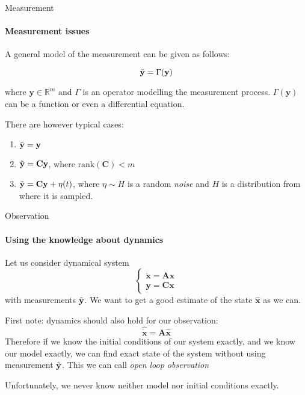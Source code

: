 \documentclass{beamer}
\begin{document}
\begin{frame}{Measurement}
\framesubtitle{Measurement issues}
\begin{flushleft}

A general model of the measurement can be given as follows:

\[
\Tilde{\mathbf y} = \Gamma(\mathbf y)
\]

where $\mathbf y \in \mathbb{R}^m$ and $\Gamma$ is an operator modelling the measurement process. $\Gamma(\mathbf y)$ can be a function or even a differential equation.

There are however typical cases:

\begin{enumerate}
\item $\Tilde{\mathbf y} = \mathbf y$
\item $\Tilde{\mathbf y} = \mathbf C \mathbf y$, where $\text{rank} (\mathbf C) < m$
\item $\Tilde{\mathbf y} = \mathbf C \mathbf y + \eta(t)$, where $\eta \sim H$ is a random \emph{noise} and $H$ is a distribution from where it is sampled.
\end{enumerate}

\end{flushleft}
\end{frame}

\begin{frame}{Observation}
\framesubtitle{Using the knowledge about dynamics}
\begin{flushleft}

Let us consider dynamical system
\[
\begin{cases}
\dot {\mathbf x} = \mathbf A \mathbf x\\
\mathbf y = \mathbf C \mathbf x
\end{cases}
\]
%
with measurements $\Tilde{\mathbf y}$. We want to get a good estimate of the state $\hat{\mathbf x}$ as we can.

\bigskip

First note: dynamics should also hold for our observation:
\[
\hat{\dot {\mathbf x}} = \mathbf A \hat{\mathbf x} 
\]
%
Therefore if we know the initial conditions of our system exactly, and we know our model exactly, we can find exact state of the system without using measurement $\Tilde{\mathbf y}$. This we can call \emph{open loop observation}

Unfortunately, we never know neither model nor initial conditions exactly.


\end{flushleft}
\end{frame}
\end{document}
